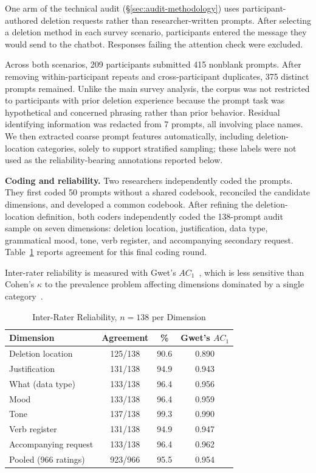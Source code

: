 \documentclass[conference,compsoc]{IEEEtran}
\begin{document}
One arm of the technical audit (\S\ref{sec:audit-methodology}) uses participant-authored deletion requests rather than researcher-written prompts. After selecting a deletion method in each survey scenario, participants entered the message they would send to the chatbot. Responses failing the attention check were excluded.

Across both scenarios, 209 participants submitted 415 nonblank prompts. After removing within-participant repeats and cross-participant duplicates, 375 distinct prompts remained. Unlike the main survey analysis, the corpus was not restricted to participants with prior deletion experience because the prompt task was hypothetical and concerned phrasing rather than prior behavior. Residual identifying information was redacted from 7 prompts, all involving place names. We then extracted coarse prompt features automatically, including deletion-location categories, solely to support stratified sampling; these labels were not used as the reliability-bearing annotations reported below.

\textbf{Coding and reliability.} Two researchers independently coded the prompts. They first coded 50 prompts without a shared codebook, reconciled the candidate dimensions, and developed a common codebook. After refining the deletion-location definition, both coders independently coded the 138-prompt audit sample on seven dimensions: deletion location, justification, data type, grammatical mood, tone, verb register, and accompanying secondary request. Table~\ref{tab:ac1} reports agreement for this final coding round.

Inter-rater reliability is measured with Gwet's $AC_1$~\cite{gwet2008ac1}, which is less sensitive than Cohen's $\kappa$ to the prevalence problem affecting dimensions dominated by a single category~\cite{gwet2008ac1,wongpakaran2013comparison}.

\begin{table}[t]
\centering
\caption{Inter-Rater Reliability, $n=138$ per Dimension}
\label{tab:ac1}
\small
\begin{tabular}{lccc}
\toprule
Dimension & Agreement & \% & Gwet's $AC_1$ \\
\midrule
Deletion location        & 125/138 & 90.6 & 0.890 \\
Justification            & 131/138 & 94.9 & 0.943 \\
What (data type)         & 133/138 & 96.4 & 0.956 \\
Mood                     & 133/138 & 96.4 & 0.959 \\
Tone                     & 137/138 & 99.3 & 0.990 \\
Verb register            & 131/138 & 94.9 & 0.947 \\
Accompanying request     & 133/138 & 96.4 & 0.962 \\
\midrule
Pooled (966 ratings) & 923/966 & 95.5 & 0.954 \\
\bottomrule
\end{tabular}
\end{table}
\end{document}
